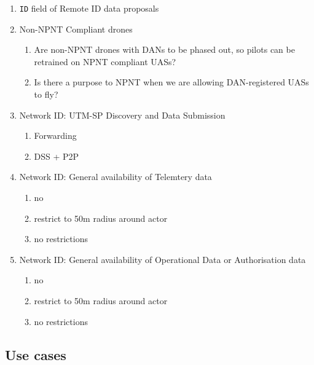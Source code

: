 \documentclass{ua_wgs_questionnaire}
\begin{document}
\begin{Form}[action={http://localhost:8000}, encoding=html, method=post]
\begin{enumerate}
\item \texttt{ID} field of Remote ID data proposals \\
\item Non-NPNT Compliant drones
\begin{enumerate}
\item Are non-NPNT drones with DANs to be phased out, so pilots can be retrained
on NPNT compliant UASs?
\item Is there a purpose to NPNT when we are allowing DAN-registered UASs
to fly?
\end{enumerate}
\item Network ID: UTM-SP Discovery and Data Submission
\begin{enumerate}
\item Forwarding
\item DSS + P2P
\end{enumerate}
\item Network ID: General availability of Telemtery data
\begin{enumerate}
\item no
\item restrict to 50m radius around actor
\item no restrictions
\end{enumerate}
\item Network ID: General availability of Operational Data or Authorisation
data
\begin{enumerate}
\item no
\item restrict to 50m radius around actor
\item no restrictions
\end{enumerate}
\end{enumerate}

\subsection{Use cases}


\end{Form}
\end{document}
